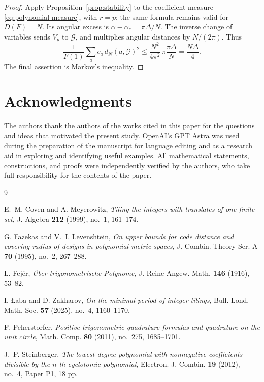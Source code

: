 \documentclass[11pt]{article}
\theoremstyle{definition}
\theoremstyle{remark}
\numberwithin{equation}{section}
\begin{document}
\begin{proof}
Apply Proposition~\ref{prop:stability} to the coefficient measure
\eqref{eq:polynomial-measure}, with $r=p$; the same formula remains
valid for $D(F)=N$.
Its angular excess is $\alpha-\alpha_*=\pi\Delta/N$.
The inverse change of variables sends $V_p$ to $\mathcal G$, and
multiplies angular distances by $N/(2\pi)$. Thus
\[
 \frac1{F(1)}\sum_ac_a\,d_N(a,\mathcal G)^2
 \le\frac{N^2}{4\pi^2}\,\pi\frac{\pi\Delta}{N}
 =\frac{N\Delta}{4}.
\]
The final assertion is Markov's inequality.
\end{proof}


\section*{Acknowledgments}

The authors thank the authors of the works cited in this paper for the
questions and ideas that motivated the present study. OpenAI's GPT Astra
was used during the preparation of the manuscript for language editing
and as a research aid in exploring and identifying useful examples.
All mathematical statements, constructions, and proofs were independently
verified by the authors, who take full responsibility for the contents
of the paper.
\begin{thebibliography}{9}

E.~M. Coven and A. Meyerowitz,
\emph{Tiling the integers with translates of one finite set},
J. Algebra \textbf{212} (1999), no.~1, 161--174.

G. Fazekas and V.~I. Levenshtein,
\emph{On upper bounds for code distance and covering radius of designs
in polynomial metric spaces},
J. Combin. Theory Ser. A \textbf{70} (1995), no.~2, 267--288.

L. Fej\'er,
\emph{\"Uber trigonometrische Polynome},
J. Reine Angew. Math. \textbf{146} (1916), 53--82.

I. \L aba and D. Zakharov,
\emph{On the minimal period of integer tilings},
Bull. Lond. Math. Soc. \textbf{57} (2025), no.~4, 1160--1170.

F. Peherstorfer,
\emph{Positive trigonometric quadrature formulas and quadrature on the
unit circle},
Math. Comp. \textbf{80} (2011), no.~275, 1685--1701.

J.~P. Steinberger,
\emph{The lowest-degree polynomial with nonnegative coefficients
divisible by the $n$-th cyclotomic polynomial},
Electron. J. Combin. \textbf{19} (2012), no.~4, Paper P1, 18 pp.

\end{thebibliography}
\end{document}
